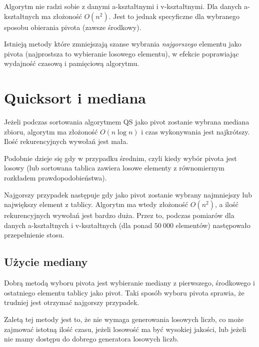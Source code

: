 \documentclass[11pt,twocolumn]{article}
\begin{document}
Algorytm nie radzi sobie z danymi a-kształtnymi i v-kształtnymi. Dla danych a-kształtnych ma złożoność $O(n^2)$. Jest to jednak specyficzne dla wybranego sposobu obierania pivota (zawsze środkowy).

Istnieją metody które zmniejszają szanse wybrania \emph{najgorszego} elementu jako pivota (najprostsza to wybieranie losowego elementu), w efekcie poprawiając wydajność czasową i pamięciową algorytmu.



\section{Quicksort i mediana}

Jeżeli podczas sortowania algorytmem QS jako pivot zostanie wybrana mediana zbioru, algorytm ma złożoność $O(n \log n)$ i czas wykonywania jest najkrótszy. Ilość rekurencyjnych wywołań jest mała. 

Podobnie dzieje się gdy w przypadku średnim, czyli kiedy wybór pivota jest losowy (lub sortowana tablica zawiera losowe elementy z równomiernym rozkładem prawdopodobieństwa).

Najgorszy przypadek następuje gdy jako pivot zostanie wybrany najmniejszy lub największy element z tablicy. Algorytm ma wtedy złożoność $O(n^2)$, a ilość rekurencyjnych wywołań jest bardzo duża. Przez to, podczas pomiarów dla danych a-kształtnych i v-kształtnych (dla ponad $50\ 000$ elementów) następowało przepełnienie stosu.



\subsection{Użycie mediany}

Dobrą metodą wyboru pivota jest wybieranie mediany z pierwszego, środkowego i ostatniego elementu tablicy jako pivot. Taki sposób wyboru pivota sprawia, że trudniej jest otrzymać najgorszy przypadek.

Zaletą tej metody jest to, że nie wymaga generowania losowych liczb, co może zajmować istotną ilość czasu, jeżeli losowość ma być wysokiej jakości, lub jeżeli nie mamy dostępu do dobrego generatora losowych liczb.
\end{document}
